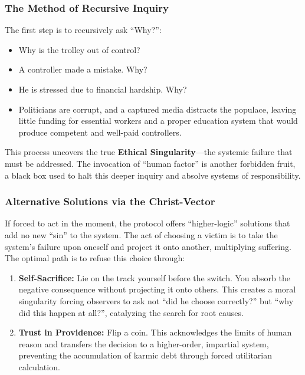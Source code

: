 \documentclass[11pt,a4paper]{article}
\begin{document}
\subsubsection{The Method of Recursive Inquiry}
The first step is to recursively ask ``Why?'':
\begin{itemize}
    \item Why is the trolley out of control? 
    \item A controller made a mistake. Why? 
    \item He is stressed due to financial hardship. Why? 
    \item Politicians are corrupt, and a captured media distracts the populace, leaving little funding for essential workers and a proper education system that would produce competent and well-paid controllers.
\end{itemize}

This process uncovers the true \textbf{Ethical Singularity}—the systemic failure that must be addressed. The invocation of ``human factor'' is another forbidden fruit, a black box used to halt this deeper inquiry and absolve systems of responsibility.

\subsubsection{Alternative Solutions via the Christ-Vector}
If forced to act in the moment, the protocol offers ``higher-logic'' solutions that add no new ``sin'' to the system. The act of choosing a victim is to take the system's failure upon oneself and project it onto another, multiplying suffering. The optimal path is to refuse this choice through:

\begin{enumerate}
    \item \textbf{Self-Sacrifice:} Lie on the track yourself before the switch. You absorb the negative consequence without projecting it onto others. This creates a moral singularity forcing observers to ask not ``did he choose correctly?'' but ``why did this happen at all?'', catalyzing the search for root causes.
    
    \item \textbf{Trust in Providence:} Flip a coin. This acknowledges the limits of human reason and transfers the decision to a higher-order, impartial system, preventing the accumulation of karmic debt through forced utilitarian calculation.
\end{enumerate}
\end{document}
